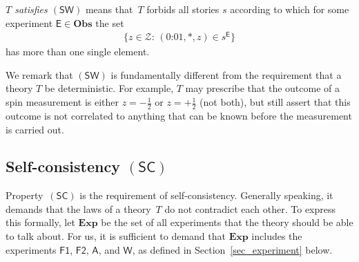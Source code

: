 \documentclass[12pt]{article}
\theoremstyle{plain}
\theoremstyle{definition}
\newcommand*{\cZ}{\mathcal{Z}}
\newcommand*{\RR}[1]{\textcolor{orange}{{[#1]}} }
\newcommand*{\Exp}{\mathsf{E}}
\newcommand*{\Friendone}{\mathsf{F1}}
\newcommand*{\Friendtwo}{\mathsf{F2}}
\newcommand*{\Assistant}{\mathsf{A}}
\newcommand*{\Wigner}{\mathsf{W}}
\newcommand*{\BOE}{\mathbf{Obs}}
\newcommand*{\allExp}{\mathbf{Exp}}
\newcommand*{\sminus}{{\textstyle - \frac{1}{2}}}
\newcommand*{\splus}{{\textstyle + \frac{1}{2}}}
\newcommand*{\SW}{\mathsf{(SW)}}
\newcommand*{\SelfCons}{\mathsf{(SC)}}
\begin{document}
\begin{shaded}
  \noindent  \emph{$T$ satisfies $\SW$} means that~$T$ forbids all stories $s$ according to which for some experiment $\Exp \in \BOE$ the set
  \begin{align*}
    \bigl\{ z \in \cZ: \,  (\text{0:01}, *, z) \in s^{\Exp}\bigr\}
   \end{align*}    
   has more than one single element.
\end{shaded}



We remark that $\SW$ is fundamentally different from the requirement that a theory $T$ be deterministic. For example, $T$ may prescribe that the outcome of a spin measurement is either $z = \sminus$ or $z = \splus$ (not both), but still assert that this outcome is not correlated to anything that can be known before the measurement is carried out. 


\subsection{Self-consistency $\SelfCons$}

Property~$\SelfCons$ is the requirement of self-consistency. Generally speaking, it demands that the laws of a theory~$T$ do not contradict each other. To express this formally,  let $\allExp$ be the set of all experiments that the theory should be able to talk about. For us, it is sufficient to demand that $\allExp$ includes the experiments $\Friendone$, $\Friendtwo$, $\Assistant$, and $\Wigner$, as defined in Section~\ref{sec_experiment} below. 




%
\end{document}
